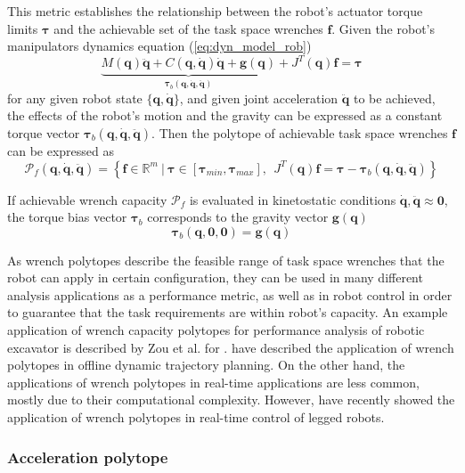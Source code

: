This metric establishes the relationship between the robot's actuator torque limits $\bm{\tau}$ and the achievable set of the task space wrenches $\bm{f}$.
Given the robot's manipulators dynamics equation (\ref{eq:dyn_model_rob}) 
\begin{equation}
\underbrace{M(\bm{q})\ddot{\bm{q}} + C(\bm{q},\dot{\bm{q}})\dot{\bm{q}} + \bm{g}(\bm{q})}_{\bm{\tau}_b(\bm{q},\dot{\bm{q}},\ddot{\bm{q}})} + J^T(\bm{q})\bm{f} = \bm{\tau} 
\end{equation}
for any given robot state $\{\bm{q},\dot{\bm{q}}\}$, and given joint acceleration $\ddot{\bm{q}}$ to be achieved, the effects of the robot's motion and the gravity can be expressed as a constant torque vector $\bm{\tau}_b(\bm{q},\dot{\bm{q}},\ddot{\bm{q}})$. Then the polytope of achievable task space wrenches $\bm{f}$ can be expressed as
\begin{equation}
    \mathcal{P}_f(\bm{q},\dot{\bm{q}},\ddot{\bm{q}}) = \left\{ \bm{f} \in \mathbb{R}^m ~|~ \bm{\tau}\in\left[\bm{\tau}_{min}, \bm{\tau}_{max} \right], ~~ J^T(\bm{q})\bm{f} = \bm{\tau} -\bm{\tau}_b(\bm{q},\dot{\bm{q}},\ddot{\bm{q}}) \right\}
    \label{eq:poly_force_rob}
\end{equation}

If achievable wrench capacity $\mathcal{P}_f$ is evaluated in kinetostatic conditions $\dot{\bm{q}},\ddot{\bm{q}}\approx\bm{0}$, the torque bias vector $\bm{\tau}_b$ corresponds to the gravity vector $\bm{g}(\bm{q})$ 
\begin{equation}
    \bm{\tau}_b(\bm{q},\bm{0},\bm{0}) = \bm{g}(\bm{q})
\end{equation}

As wrench polytopes describe the feasible range of task space wrenches that the robot can apply in certain configuration, they can be used in many different analysis applications as a performance metric, as well as in robot control in order to guarantee that the task requirements are within robot's capacity. An example application of wrench capacity polytopes for performance analysis of robotic excavator is described by Zou et al. for \cite{Zou2019}. \citet{ferrolho_residual_2020} have described the application of wrench polytopes in offline dynamic trajectory planning. On the other hand, the applications of wrench polytopes in real-time applications are less common, mostly due to their computational complexity. However, \citet{Orsolino2018} have recently showed the application of wrench polytopes in real-time control of legged robots.

\subsubsection{Acceleration polytope}
\label{ch:accel_poly_robot}

